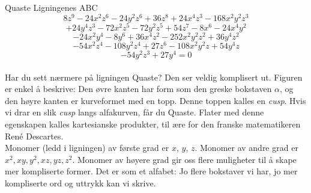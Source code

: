\begin{surferPage}{Quaste}
Ligningenes ABC
  \smallskip
\[8z^9-24x^2z^6-24y^2z^6+36z^8+24x^4z^3-168x^2y^2z^3\]
\[+24y^4z^3-72x^2z^5-72y^2z^5+54z^7-8x^6-24x^4y^2\]
\[-24x^2y^4-8y^6 + 36x^4z^2-252x^2y^2z^2+36y^4z^2\]
\[- 54x^2z^4-108y^2z^4 + 27z^6-108x^2y^2z + 54y^4z\]
\[-54y^2z^3 + 27y^4 = 0\]\\
\vspace{0.3cm}
Har du sett nærmere på ligningen Quaste? Den ser veldig komplisert ut. Figuren er enkel å beskrive: Den øvre kanten har form som den greske bokstaven $\alpha$, og den høyre kanten er kurveformet med en topp. Denne toppen kalles en {\it cusp}. Hvis vi drar en slik {\it cusp} langs alfakurven, får du Quaste. Flater med denne egenskapen kalles kartesianske produkter, til ære for den franske matematikeren Ren\'e Descartes.\\
\vspace{0.3cm}
Monomer (ledd i ligningen) av første grad er $x$, $y$, $z$. Monomer av andre grad er $x^2, xy, y^2, xz, yz, z^2$. Monomer av høyere grad gir oss flere muligheter til å skape mer kompliserte former. Det er som et alfabet: Jo flere bokstaver vi har, jo mer kompliserte ord og uttrykk kan vi skrive.
\end{surferPage}
